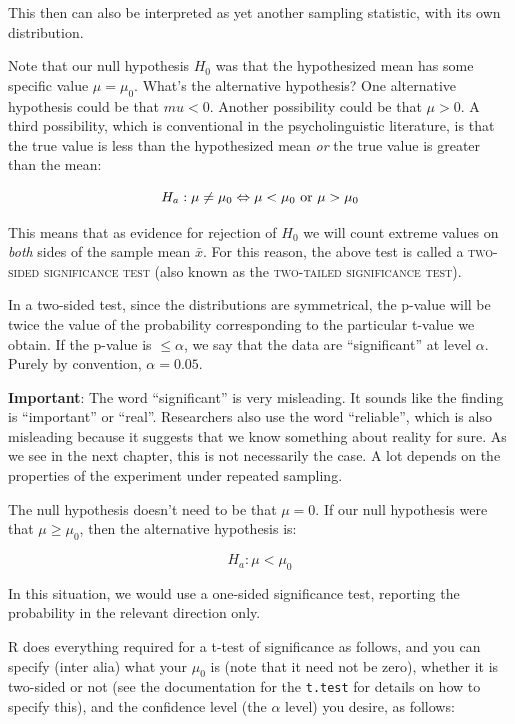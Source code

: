 \documentclass[12pt]{book}\usepackage[]{graphicx}\usepackage[]{color}
\begin{document}
This then can also be interpreted as yet another sampling statistic, with its own distribution.

Note that our null hypothesis $H_0$ was that
the hypothesized mean has some specific value $\mu=\mu_0$.
What's the alternative hypothesis? One alternative hypothesis could be that $mu<0$. Another possibility could be that $\mu>0$. A third possibility, which is conventional in the psycholinguistic literature, is that the true value is less than the hypothesized mean \emph{or} the true value is greater than the mean:

\begin{equation}
H_a: \mu\neq \mu_0 \Leftrightarrow \mu < \mu_0 \hbox{ or } \mu > \mu_0
\end{equation}

This means that as evidence for rejection of $H_0$ we will
count extreme values on \emph{both} sides of the sample mean $\bar{x}$. For this reason, the above test is called a \textsc{two-sided significance test} (also known as the \textsc{two-tailed significance test}). 

In a two-sided test, since the distributions are symmetrical, the p-value will be twice the value of the probability corresponding to the particular t-value we obtain.
If the p-value is
$\leq \alpha$, we say that the data are ``significant'' at level $\alpha$. Purely by convention, $\alpha=0.05$.

\textbf{Important}: The word ``significant'' is very misleading.  It sounds like the finding is ``important'' or ``real''. Researchers also use the word ``reliable'', which is also misleading because it suggests that we know something about reality for sure. As we see in the next chapter, this is not necessarily the case. A lot depends on the properties of the experiment under repeated sampling.

The null hypothesis doesn't need to be that $\mu=0$. If our null hypothesis were that $\mu \geq \mu_0$, then the alternative hypothesis is:

\begin{equation}
H_a:  \mu < \mu_0	
\end{equation}
 
In this situation, we would use a one-sided significance test, reporting the probability in the relevant direction only.

R does everything required for a t-test of significance as follows,
and you can specify (inter alia) what your $\mu_0$ is (note that it
need not be zero), whether it is two-sided or not (see the
documentation for the \texttt{t.test} for details on how to specify
this), and the confidence level (the $\alpha$ level) you desire, as follows:
\end{document}
